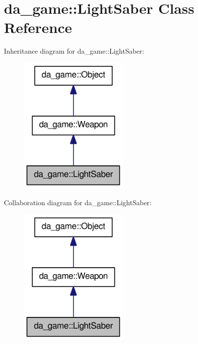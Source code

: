 \hypertarget{classda__game_1_1LightSaber}{
\section{da\_\-game::LightSaber Class Reference}
\label{classda__game_1_1LightSaber}
}
Inheritance diagram for da\_\-game::LightSaber:\nopagebreak
\begin{figure}[H]
\begin{center}
\leavevmode
\includegraphics[width=152pt]{classda__game_1_1LightSaber__inherit__graph}
\end{center}
\end{figure}
Collaboration diagram for da\_\-game::LightSaber:\nopagebreak
\begin{figure}[H]
\begin{center}
\leavevmode
\includegraphics[width=152pt]{classda__game_1_1LightSaber__coll__graph}
\end{center}
\end{figure}
